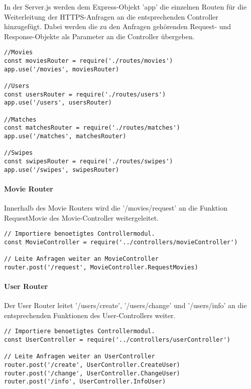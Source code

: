 In der Server.js werden dem Express-Objekt 'app' die einzelnen Routen für die Weiterleitung der HTTPS-Anfragen an die entsprechenden Controller hinzugefügt. Dabei werden die zu den Anfragen gehörenden Request- und Response-Objekte als Parameter an die Controller übergeben.

\begin{lstlisting}[caption=Routing in server.js, label=lst:routingserver]
//Movies
const moviesRouter = require('./routes/movies')
app.use('/movies', moviesRouter)

//Users
const usersRouter = require('./routes/users')
app.use('/users', usersRouter)

//Matches
const matchesRouter = require('./routes/matches')
app.use('/matches', matchesRouter)

//Swipes
const swipesRouter = require('./routes/swipes')
app.use('/swipes', swipesRouter)

\end{lstlisting}

\paragraph{Movie Router}
Innerhalb des Movie Routers wird die '/movies/request' an die Funktion RequestMovie des Movie-Controller weitergeleitet.
\begin{lstlisting}[caption=Routing in movieRouter.js, label=lst:routingmovie]
// Importiere benoetigtes Controllermodul.
const MovieController = require('../controllers/movieController')

// Leite Anfragen weiter an MovieController
router.post('/request', MovieController.RequestMovies)
\end{lstlisting}

\paragraph{User Router}
Der User Router leitet '/users/create', '/users/change' und '/users/info' an die entsprechenden Funktionen des User-Controllers weiter.
\begin{lstlisting}[caption=Routing in userRouter.js, label=lst:routinguser]
// Importiere benoetigtes Controllermodul.
const UserController = require('../controllers/userController')

// Leite Anfragen weiter an UserController
router.post('/create', UserController.CreateUser)
router.post('/change', UserController.ChangeUser)
router.post('/info', UserController.InfoUser)
\end{lstlisting}

